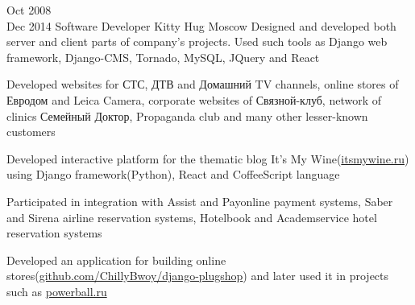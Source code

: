 \documentclass[11pt,a4paper,sans]{moderncv}
\newcommand{\lang}[2]{#2}
\begin{document}
\cventry
    {\lang{Окт}{Oct} 2008\\\lang{Дек}{Dec} 2014}
    {\lang
        {Программист}
        {Software Developer}}
    {Kitty Hug}
    {\lang
        {Москва}
        {Moscow}}
    {}
    {\lang
        {Занимался разработкой и проектированием как серверной, так и клиентской части проектов компании. Использовал Django, Django-CMS, Tornado, MySQL, JQuery и React, занимался написанием юнит-тестов.}
        {Designed and developed both server and client parts of company's projects. Used such tools as Django web framework, Django-CMS, Tornado, MySQL, JQuery and React}}

\cvlistitem
    {\lang
        {Делал сайты для телеканалов СТС, ДТВ и Домашний, интернет-магазина «Евродом», фотоаппаратов «Leica Camera», «Связного-клуба», сети поликлиник «Семейный Доктор», клуба «Пропаганда», кафе «Filial»(\href{http://filialmoscow.com/ru/}{filialmoscow.com}), торгово-офисного центра «Гименей»(\href{http://himeney.ru}{himeney.ru}) и многих других менее известных клиентов}
        {Developed websites for {\textquotedbl}СТС{\textquotedbl}, {\textquotedbl}ДТВ{\textquotedbl} and {\textquotedbl}Домашний{\textquotedbl} TV channels, online stores of Евродом{\textquotedbl} and {\textquotedbl}Leica Camera{\textquotedbl}, corporate websites of {\textquotedbl}Связной-клуб{\textquotedbl}, network of clinics {\textquotedbl}Семейный Доктор{\textquotedbl}, {\textquotedbl}Propaganda club{\textquotedbl} and many other lesser-known customers}}


\cvlistitem
    {\lang
        {TODO}
        {Developed interactive platform for the thematic blog {\textquotedbl}It's My Wine{\textquotedbl}(\href{http://itsmywine.ru}{itsmywine.ru}) using Django framework(Python), React and CoffeeScript language}}


\cvlistitem
    {\lang
        {Занимался интеграцией с платёжными системами Assist и Payonline, системами бронирования авиабилетов Sabre и Sirena, системами бронирования отелей Hotelbook и Академсервис}
        {Participated in integration with {\textquotedbl}Assist{\textquotedbl} and {\textquotedbl}Payonline{\textquotedbl} payment systems, {\textquotedbl}Saber{\textquotedbl} and {\textquotedbl}Sirena{\textquotedbl} airline reservation systems, {\textquotedbl}Hotelbook{\textquotedbl} and {\textquotedbl}Academservice{\textquotedbl} hotel reservation systems}}

\cvlistitem
    {\lang
        {Разработал приложение \href{https://github.com/ChillyBwoy/django-plugshop}{django-plugshop}, на основе которого в дальнейшем было создано несколько интернет-магазинов, например deathstar.ru и \href{http://powerball.ru}{powerball.ru}}
        {Developed an application for building online stores(\href{https://github.com/ChillyBwoy/django-plugshop}{github.com/ChillyBwoy/django-plugshop})} and later used it in projects such as \href{http://powerball.ru}{powerball.ru}\\}
\end{document}

